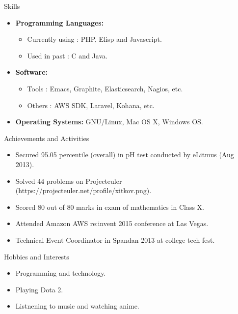 \documentclass[a4paper,11pt,oneside]{article}
\newenvironment{ressection}[1]{
  \vspace{4pt}
         {\fontfamily{phv}\selectfont\Large#1}
         \begin{itemize}
           \vspace{3pt}
}{
         \end{itemize}
}
\newcommand{\resitem}[1]{
  \vspace{-4pt}
\item \begin{flushleft} #1 \end{flushleft}
}
\newcommand{\ressubitem}[1]{
  \vspace{-1pt}
\item \begin{flushleft} #1 \end{flushleft}
}
\newenvironment{reslist}[1]{
  \resitem{\textbf{#1}}
  \vspace{-5pt}
  \begin{itemize}
}{
  \end{itemize}
}
\begin{document}

\begin{ressection}{Skills}
  \begin{reslist}{Programming Languages:}
    \ressubitem{Currently using : PHP, Elisp and Javascript.}
    \ressubitem{Used in past : C and Java.}
  \end{reslist}
  \begin{reslist}{Software:}
    \ressubitem{Tools : Emacs, Graphite, Elasticsearch, Nagios, etc.}
    \ressubitem{Others : AWS SDK, Laravel, Kohana, etc.}
  \end{reslist}
    \resitem{\textbf{Operating Systems:} GNU/Linux, Mac OS X, Windows OS.}
\end{ressection}


\begin{ressection}{Achievements and Activities}
  \resitem{Secured 95.05 percentile (overall) in pH test conducted by eLitmus (Aug 2013).}
  \resitem{Solved 44 problems on Projecteuler (https://projecteuler.net/profile/xitkov.png).}
  \resitem{Scored 80 out of 80 marks in exam of mathematics in Class X.}
  \resitem{Attended Amazon AWS re:invent 2015 conference at Las Vegas.}
  \resitem{Technical Event Coordinator in Spandan 2013 at college tech fest.}
\end{ressection}


\begin{ressection}{Hobbies and Interests}
  \resitem{Programming and technology.}
  \resitem{Playing Dota 2.}
  \resitem{Listnening to music and watching anime.}
\end{ressection}
\end{document}
